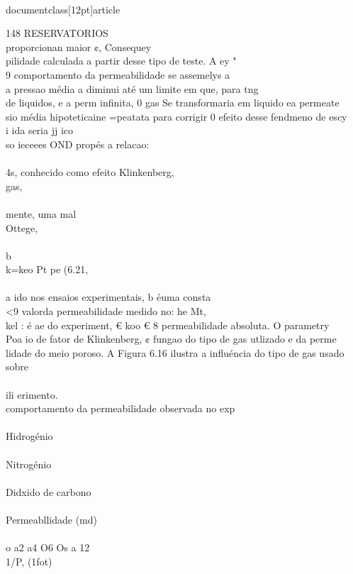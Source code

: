 \\documentclass[12pt]{article}
\begin{document}
148 RESERVATORIOS\\
proporcionan maior ¢, Consequey\\
pilidade calculada a partir desse tipo de teste. A ey "\\
9 comportamento da permeabilidade se assemelys a\\
a pressao média a diminui até um limite em que, para tng\\
de liquidos, e a perm infinita, 0 gas Se transformaria em liquido ea permeate\\
sio média hipoteticaine  =peatata para corrigir 0 efeito desse fendmeno de escy\\
i ida seria jj ico\\
so ieceees OND propés a relacao:\\
\\
4s, conhecido como efeito Klinkenberg,\\
gas,\\
\\
mente, uma mal\\
Ottege,\\
\\
b\\
k=keo Pt pe (6.21,\\
\\
a ido nos ensaios experimentais, b éuma consta\\
<9 valorda permeabilidade medido no: he Mt,\\
kel : é ae do experiment, € koo € 8 permeabilidade absoluta. O parametry\\
Poa io de fator de Klinkenberg, ¢ fungao do tipo de gas utlizado e da perme\\
lidade do meio poroso. A Figura 6.16 ilustra a influéncia do tipo de gas usado sobre\\
\\
ili erimento.\\
comportamento da permeabilidade observada no exp\\
\\
Hidrogénio\\
\\
Nitrogénio\\
\\
Didxido de carbono\\
\\
Permeabllidade (md)\\
\\
o a2 a4 O6 Os a 12\\
1/P, (1fot)\\
\\
\end{document}
